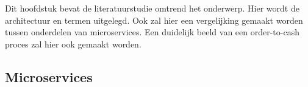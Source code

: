 \chapter{}
\label{ch:stand-van-zaken}



Dit hoofdstuk bevat de literatuurstudie omtrend het onderwerp. Hier wordt de architectuur en termen uitgelegd. Ook zal hier een vergelijking gemaakt worden tussen onderdelen van microservices. Een duidelijk beeld van een order-to-cash proces zal hier ook gemaakt worden.

\section{Microservices}
